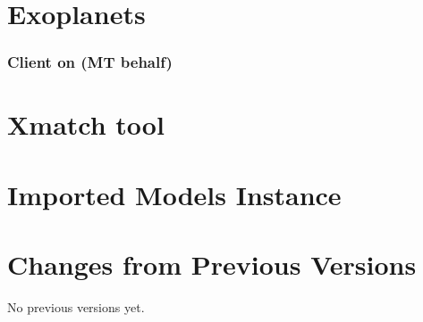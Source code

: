 \documentclass[11pt,a4paper]{ivoa}
\begin{document}
\section{Exoplanets}


\subsubsection{Client on (MT behalf)}


\section{Xmatch tool }


\section{Imported Models Instance}

\section{Changes from Previous Versions}

No previous versions yet.



\end{document}
